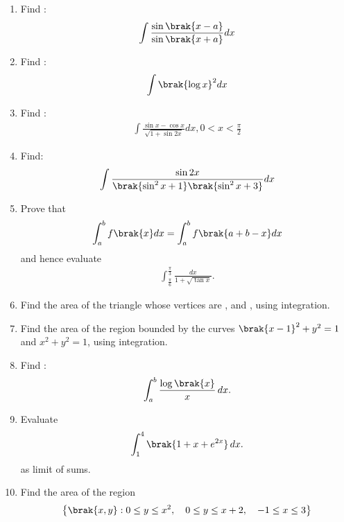 \begin{enumerate}
\item Find :
\begin{align*}
   \int{\frac{\sin\brak{x-a} }{\sin\brak{x+a}}}dx  
\end{align*}
\item Find :
\begin{align*}
    \int{\brak{\log{x}}^2} dx
\end{align*}
\item Find :
\begin{align*}
   \int{\frac{\sin {x}-\cos {x}}{\sqrt{1 +\sin {2x}}} }dx,  0 < x<\frac{\pi}{2}
\end{align*}
\item Find:
\begin{align*}
 \int{\frac{\sin {2x}}{\brak{\sin^{2}x + 1}\brak{\sin^{2}x + 3}}}dx
\end{align*}
\item Prove that  
\begin{align*}\int_{a}^{b}{ f\brak{x}} dx = \int_{a}^{b}{f\brak{a + b - x}}dx 
\end{align*} and hence evaluate 
\begin{align*}  
\int_{\frac{\pi}{6}}^{\frac{\pi}{3}} {\frac{dx}{1 + \sqrt{\tan x}}}.
\end{align*}
\item Find the area of the triangle whose vertices are , and , using integration.
\item Find the area of the region bounded by the curves $\brak{x-1}^{2} + y^{2} = 1$ and $x^{2} + y^{2} = 1$, using integration.
\item Find : 
 \begin{align*}
\int_{a}^{b}{\dfrac{\log{\brak{x}}}{x}\,}dx .
 \end{align*}
\item Evaluate 
\begin{align*}
     \int_{1}^{4}{\brak{1+x+e^{2x}}\,}dx .   
\end{align*}
as limit of sums.
\item Find the area of the region 
 \begin{align*}
  \left\{\brak{x, y} : 0 \leq y \leq x^{2}, \quad 0 \leq y \leq x+2, \quad -1 \leq x \leq 3 \right\}
 \end{align*}
 

\end{enumerate}
